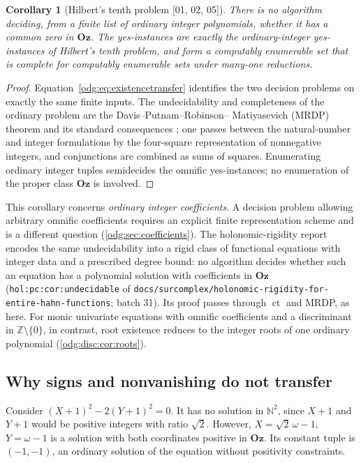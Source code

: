 \documentclass[11pt,oneside]{article}
\numberwithin{equation}{section}
\newtheorem{corollary}[corollary]{Corollary}
\theoremstyle{definition}
\theoremstyle{remark}
\newcommand{\Oz}{\mathbf{Oz}}
\newcommand{\Z}{\mathbb Z}
\newcommand{\N}{\mathbb N}
\newcommand{\ct}{\operatorname{ct}}
\newcommand{\src}[1]{\textup{\textsf{\small[#1]}}}
\newcommand{\replabel}[1]{\nolinkurl{#1}}
\newcommand{\fn}[1]{\nolinkurl{#1}}
\begin{document}
\begin{corollary}[Hilbert's tenth problem \src{01, 02, 05}]\label{odg:cor:H10}
There is no algorithm deciding, from a finite list of ordinary integer
polynomials, whether it has a common zero in $\Oz$. The yes-instances are
exactly the ordinary-integer yes-instances of Hilbert's tenth problem, and
form a computably enumerable set that is complete for computably enumerable
sets under many-one reductions.
\end{corollary}
\begin{proof}
Equation~\eqref{odg:eq:existencetransfer} identifies the two decision
problems on exactly the same finite inputs. The undecidability and
completeness of the ordinary problem are the Davis--Putnam--Robinson--%
Matiyasevich (MRDP) theorem and its standard consequences
\cite{Matiyasevich,MatiyasevichBook,Poonen,Scholarpedia}; one passes between
the natural-number and integer formulations by the four-square
representation of nonnegative integers, and conjunctions are combined as sums
of squares. Enumerating ordinary integer tuples semidecides the omnific
yes-instances; no enumeration of the proper class $\Oz$ is involved.
\end{proof}

This corollary concerns \emph{ordinary integer coefficients}. A decision
problem allowing arbitrary omnific coefficients requires an explicit
finite representation scheme and is a different question
(\cref{odg:sec:coefficients}).
The holonomic-rigidity report encodes the same undecidability into a rigid class of
functional equations with integer data and a prescribed degree bound: no algorithm decides
whether such an equation has a polynomial solution with coefficients in $\Oz$
(\replabel{hol:pc:cor:undecidable} of
\fn{docs/surcomplex/holonomic-rigidity-for-entire-hahn-functions}; batch 31). Its proof
passes through $\ct$ and MRDP, as here. For monic univariate equations with omnific
coefficients and a discriminant in $\Z\setminus\{0\}$, in contrast, root existence
reduces to the integer roots of one ordinary polynomial (\cref{odg:disc:cor:roots}).

\subsection{Why signs and nonvanishing do not transfer}

Consider $(X+1)^2-2(Y+1)^2=0$. It has no solution in $\N^2$, since $X+1$
and $Y+1$ would be positive integers with ratio $\sqrt2$. However,
$X=\sqrt2\,\omega-1$, $Y=\omega-1$ is a solution with both coordinates
positive in $\Oz$. Its constant tuple is $(-1,-1)$, an ordinary solution of
the equation without positivity constraints.
\end{document}
